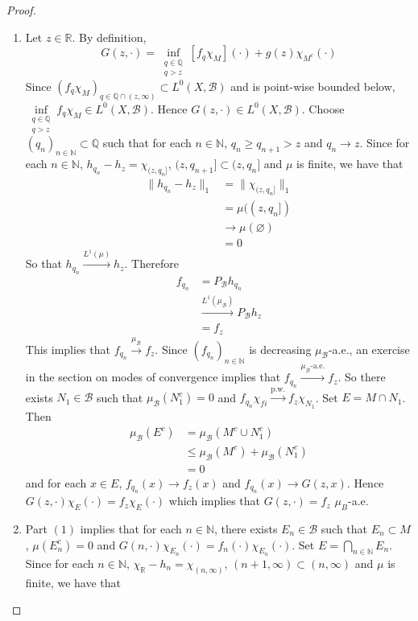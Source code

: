 \documentclass[12pt]{amsart}
\theoremstyle{definition}
\newcommand{\N}{\mathbb{N}}
\newcommand{\R}{\mathbb{R}}
\newcommand{\Q}{\mathbb{Q}}
\newcommand{\MB}{\mathcal{B}}
\newcommand{\convt}[1]{\xrightarrow{\text{#1}}}
\newcommand{\conv}[1]{\xrightarrow{#1}}
\begin{document}
	\begin{proof}\
		\begin{enumerate}
			\item Let $z \in \R$. By definition,
			$$G(z, \cdot) = \inf\limits_{\substack{q \in \Q \\ q > z}}[ f_q \chi_M ] (\cdot) + g(z) \chi_{M^c}(\cdot)$$ 
			Since $(f_{q} \chi_{M})_{q \in \Q\cap (z, \infty)} \subset L^0(X, \MB)$ and is point-wise bounded below, $\inf\limits_{\substack{q \in \Q \\ q > z}} f_q \chi_M  \in L^0(X, \MB)$. Hence $G(z, \cdot) \in L^0(X, \MB)$. Choose $(q_n)_{n \in \N} \subset \Q$ such that for each $n \in \N$, $q_n \geq q_{n+1} > z$ and $q_n \rightarrow z$. Since for each $n \in \N$, $h_{q_n} - h_{z} = \chi_{(z, q_n]}$, $(z, q_{n+1}] \subset (z, q_n]$ and $\mu$ is finite, we have that 
			\begin{align*}
				\|h_{q_n} - h_z\|_1
				& = \|\chi_{(z, q_n]}\|_1 \\
				& = \mu((z, q_n]) \\
				& \rightarrow \mu(\varnothing) \\
				& = 0
			\end{align*}
			So that $h_{q_n} \conv{L^1(\mu)} h_z$. Therefore  
			\begin{align*}
				f_{q_n} 
				& = P_{\MB} h_{q_n} \\
				& \conv{L^1(\mu_{\MB})} P_{\MB} h_z \\
				& = f_z
			\end{align*}
			This implies that $f_{q_n} \conv{\mu_{\MB}} f_z$. Since $(f_{q_n})_{n \in \N}$ is decreasing $\mu_{\MB}$-a.e., an exercise in the section on modes of convergence implies that $f_{q_n} \convt{$\mu_{\MB}$-a.e.} f_z$. So there exists $N_1 \in \MB$ such that $\mu_{\MB}(N_1^c) = 0$ and $f_{q_n} \chi_{fi} \convt{p.w.} f_z \chi_{N_1}$. Set $E = M \cap N_1$. Then  
			\begin{align*}
				\mu_{\MB}(E^c)
				& = \mu_{\MB}(M^c \cup N_1^c) \\ 
				& \leq \mu_{\MB}(M^c) + \mu_{\MB}(N_1^c) \\
				& = 0
			\end{align*}
			and for each $x \in E$, $f_{q_n}(x) \rightarrow f_z(x)$ and $f_{q_n}(x) \rightarrow G(z, x)$. Hence $G(z, \cdot)\chi_{E}(\cdot) = f_z \chi_{E}( \cdot)$ which implies that $G(z, \cdot) = f_z$ $\mu_B$-a.e.\\
			\item Part $(1)$ implies that for each $n \in \N$, there exists $E_n \in \MB$ such that $E_n \subset M$, $\mu(E_n^c) = 0$ and $G(n, \cdot)\chi_{E_n}(\cdot) = f_n(\cdot) \chi_{E_n}(\cdot)$. Set $E = \bigcap\limits_{n \in \N} E_n$. Since for each $n \in \N$, $\chi_{\R} - h_n = \chi_{(n, \infty)}$, $(n+1, \infty) \subset (n, \infty)$ and $\mu$ is finite, we have that 

\end{enumerate}
\end{proof}
\end{document}
